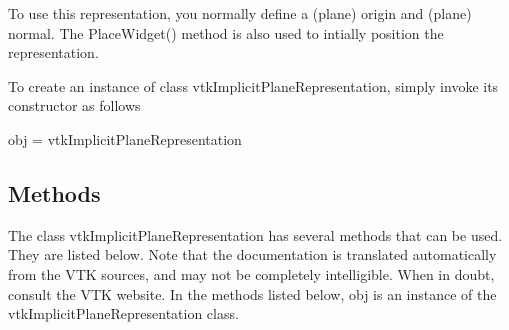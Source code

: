 To use this representation, you normally define a (plane) origin and (plane) normal. The Place\-Widget() method is also used to intially position the representation.

To create an instance of class vtk\-Implicit\-Plane\-Representation, simply invoke its constructor as follows \begin{DoxyVerb}  obj = vtkImplicitPlaneRepresentation
\end{DoxyVerb}
 \hypertarget{vtkwidgets_vtkxyplotwidget_Methods}{}\subsection{Methods}\label{vtkwidgets_vtkxyplotwidget_Methods}
The class vtk\-Implicit\-Plane\-Representation has several methods that can be used. They are listed below. Note that the documentation is translated automatically from the V\-T\-K sources, and may not be completely intelligible. When in doubt, consult the V\-T\-K website. In the methods listed below, {\ttfamily obj} is an instance of the vtk\-Implicit\-Plane\-Representation class. 
